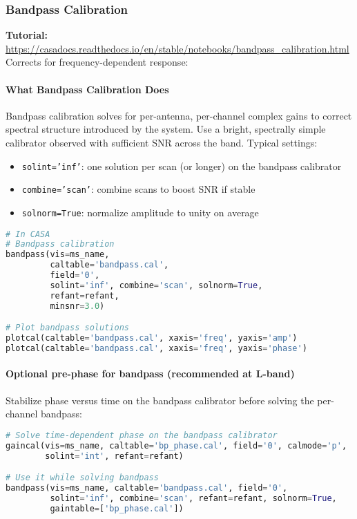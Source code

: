\documentclass[11pt]{article}
\begin{document}
\subsubsection{Bandpass Calibration}
\textbf{Tutorial:} \url{https://casadocs.readthedocs.io/en/stable/notebooks/bandpass\_calibration.html}
Corrects for frequency-dependent response:

\paragraph{What Bandpass Calibration Does}
Bandpass calibration solves for per-antenna, per-channel complex gains to correct spectral structure introduced by the system. Use a bright, spectrally simple calibrator observed with sufficient SNR across the band. Typical settings:
\begin{itemize}
    \item \texttt{solint='inf'}: one solution per scan (or longer) on the bandpass calibrator
    \item \texttt{combine='scan'}: combine scans to boost SNR if stable
    \item \texttt{solnorm=True}: normalize amplitude to unity on average
\end{itemize}

\begin{lstlisting}[language=Python]
# In CASA
# Bandpass calibration
bandpass(vis=ms_name, 
         caltable='bandpass.cal', 
         field='0', 
         solint='inf', combine='scan', solnorm=True,
         refant=refant,
         minsnr=3.0)

# Plot bandpass solutions
plotcal(caltable='bandpass.cal', xaxis='freq', yaxis='amp')
plotcal(caltable='bandpass.cal', xaxis='freq', yaxis='phase')
\end{lstlisting}

\paragraph{Optional pre-phase for bandpass (recommended at L-band)}
Stabilize phase versus time on the bandpass calibrator before solving the per-channel bandpass:
\begin{lstlisting}[language=Python]
# Solve time-dependent phase on the bandpass calibrator
gaincal(vis=ms_name, caltable='bp_phase.cal', field='0', calmode='p',
        solint='int', refant=refant)

# Use it while solving bandpass
bandpass(vis=ms_name, caltable='bandpass.cal', field='0',
         solint='inf', combine='scan', refant=refant, solnorm=True,
         gaintable=['bp_phase.cal'])
\end{lstlisting}
\end{document}
